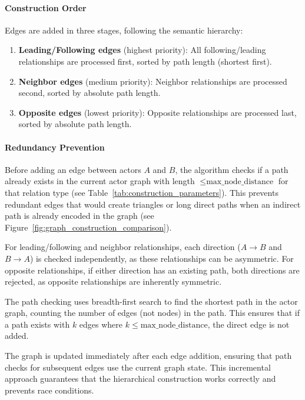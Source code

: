 \paragraph{Construction Order}

Edges are added in three stages, following the semantic hierarchy:

\begin{enumerate}
    \item \textbf{Leading/Following edges} (highest priority): All following/leading relationships 
          are processed first, sorted by path length (shortest first).
    
    \item \textbf{Neighbor edges} (medium priority): Neighbor relationships are processed second, 
          sorted by absolute path length.
    
    \item \textbf{Opposite edges} (lowest priority): Opposite relationships are processed last, 
          sorted by absolute path length.
\end{enumerate}

\paragraph{Redundancy Prevention}

Before adding an edge between actors $A$ and $B$, the algorithm checks if a path already exists 
in the current actor graph with length $\leq \text{max\_node\_distance}$ for that relation type (see Table~\ref{tab:construction_parameters}). 
This prevents redundant edges that would create triangles or long direct paths when an indirect path is already encoded in the graph 
(see Figure~\ref{fig:graph_construction_comparison}).

For leading/following and neighbor relationships, each direction ($A \to B$ and $B \to A$) is 
checked independently, as these relationships can be asymmetric. For opposite relationships, if 
either direction has an existing path, both directions are rejected, as opposite relationships are 
inherently symmetric.

The path checking uses breadth-first search to find the shortest path in the actor graph, counting 
the number of edges (not nodes) in the path. This ensures that if a path exists with $k$ edges 
where $k \leq \text{max\_node\_distance}$, the direct edge is not added.


The graph is updated immediately after each edge addition, ensuring that path checks for 
subsequent edges use the current graph state. This incremental approach guarantees that the 
hierarchical construction works correctly and prevents race conditions.

